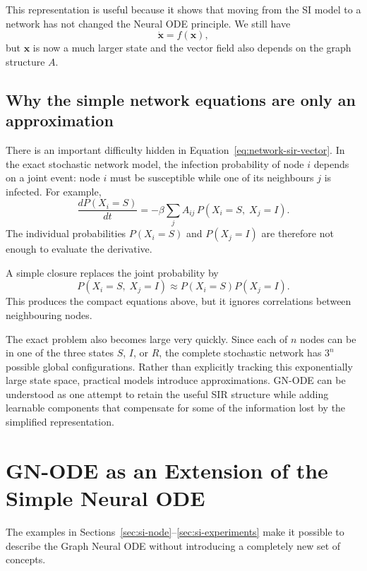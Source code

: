 \documentclass[11pt,a4paper]{article}
\begin{document}
This representation is useful because it shows that moving from the SI model
to a network has not changed the Neural ODE principle. We still have
\[
    \dot{\mathbf{x}}=f(\mathbf{x}),
\]
but $\mathbf{x}$ is now a much larger state and the vector field also depends
on the graph structure $A$.


\subsection{Why the simple network equations are only an approximation}

There is an important difficulty hidden in
Equation~\eqref{eq:network-sir-vector}. In the exact stochastic network model,
the infection probability of node $i$ depends on a joint event: node $i$ must
be susceptible while one of its neighbours $j$ is infected. For example,
\begin{equation}
    \frac{dP(X_i=S)}{dt}
    =
    -\beta\sum_j
    A_{ij}\,
    P(X_i=S,\;X_j=I).
    \label{eq:exact-node}
\end{equation}
The individual probabilities $P(X_i=S)$ and $P(X_j=I)$ are therefore not
enough to evaluate the derivative.

A simple closure replaces the joint probability by
\[
    P(X_i=S,\;X_j=I)
    \approx
    P(X_i=S)P(X_j=I).
\]
This produces the compact equations above, but it ignores correlations between
neighbouring nodes.

The exact problem also becomes large very quickly. Since each of $n$ nodes can
be in one of the three states $S$, $I$, or $R$, the complete stochastic
network has $3^n$ possible global configurations. Rather than explicitly
tracking this exponentially large state space, practical models introduce
approximations. GN-ODE can be understood as one attempt to retain the useful
SIR structure while adding learnable components that compensate for some of
the information lost by the simplified representation.


\section{GN-ODE as an Extension of the Simple Neural ODE}
\label{sec:gnode}

The examples in Sections~\ref{sec:si-node}--\ref{sec:si-experiments} make it
possible to describe the Graph Neural ODE without introducing a completely new
set of concepts.
\end{document}
